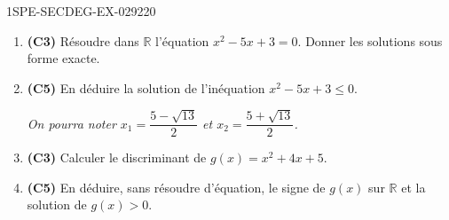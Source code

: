 \begin{exercice}{1SPE-SECDEG-EX-029}{2}{20}
\begin{enumerate}
  \item \textbf{(C3)} Résoudre dans $\mathbb{R}$ l'équation $x^2 - 5x + 3 = 0$. Donner les solutions sous forme exacte.
  \item \textbf{(C5)} En déduire la solution de l'inéquation $x^2 - 5x + 3 \leqslant 0$.

  \textit{On pourra noter $x_1 = \dfrac{5 - \sqrt{13}}{2}$ et $x_2 = \dfrac{5 + \sqrt{13}}{2}$.}

  \item \textbf{(C3)} Calculer le discriminant de $g(x) = x^2 + 4x + 5$.
  \item \textbf{(C5)} En déduire, sans résoudre d'équation, le signe de $g(x)$ sur $\mathbb{R}$ et la solution de $g(x) > 0$.
\end{enumerate}
\end{exercice}
